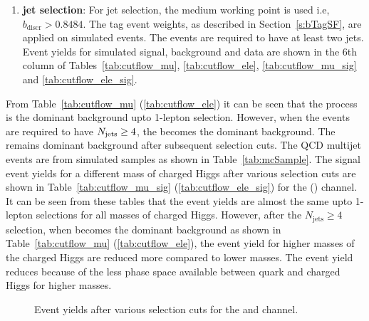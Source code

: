 \begin{enumerate}[leftmargin=*]
\item {\bf{ jet selection}}:
For \PQb jet selection, the medium working point is used i.e, $b_{\text{discr}} > 0.8484$. 
The \PQb tag event weights, as described in Section~\ref{s:bTagSF}, are applied on simulated events. 
The events are required to have at least two \PQb jets. Event yields for simulated signal, background 
and data are shown in the 6th column of Tables~\ref{tab:cutflow_mu}, \ref{tab:cutflow_ele}, 
\ref{tab:cutflow_mu_sig} and \ref{tab:cutflow_ele_sig}.
\end{enumerate}

From Table~\ref{tab:cutflow_mu} (\ref{tab:cutflow_ele}) it can be seen that the \wjets 
process is the dominant background upto 1-lepton selection. However, when the events are 
required to have $N_{\rm{jets}} \geq 4$, the \ttjets becomes the dominant background. The \ttjets 
remains dominant background after subsequent selection cuts. The QCD multijet events are from
simulated samples as shown in Table~\ref{tab:mcSample}. The signal event yields for a different 
mass of charged Higgs after various selection cuts are shown in Table~\ref{tab:cutflow_mu_sig}
(\ref{tab:cutflow_ele_sig}) for the \mujets (\ejets) channel. It can be seen from these tables 
that the event yields are almost the same upto 1-lepton selections for all masses of charged Higgs. 
However, after the $N_{\text{jets}} \geq 4$ selection, when \ttjets becomes the dominant 
background as shown in Table~\ref{tab:cutflow_mu} (\ref{tab:cutflow_ele}), the event yield 
for higher masses of the charged Higgs are reduced more compared to lower masses. The 
event yield reduces because of the less phase space available between \PQt quark and charged 
Higgs for higher masses.
    
\begin{center}
\begin{figure}
\caption{ Event yields after various selection cuts for the \mujets and \ejets channel.} 
\label{fig:cutflow}
\end{figure}
\end{center}

